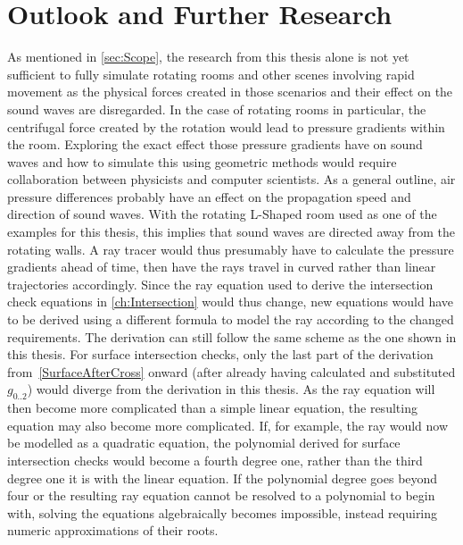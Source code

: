 \chapter{Outlook and Further Research}\label{ch:Outlook}

As mentioned in \autoref{sec:Scope},
the research from this thesis alone is not yet sufficient to fully simulate rotating rooms
and other scenes involving rapid movement
as the physical forces created in those scenarios and their effect on the sound waves are disregarded.
\newline
In the case of rotating rooms in particular,
the centrifugal force created by the rotation would lead to pressure gradients within the room.
Exploring the exact effect those pressure gradients have on sound waves
and how to simulate this using geometric methods would require collaboration between physicists and computer scientists.
\newline
As a general outline, air pressure differences probably have an effect on the propagation speed and direction of sound waves.
With the rotating L-Shaped room used as one of the examples for this thesis,
this implies that sound waves are directed away from the rotating walls.
A ray tracer would thus presumably have to calculate the pressure gradients ahead of time,
then have the rays travel in curved rather than linear trajectories accordingly.
\newline
Since the ray equation used to derive the intersection check equations in \autoref{ch:Intersection} would thus change,
new equations would have to be derived using a different formula to model the ray according to the changed requirements.
The derivation can still follow the same scheme as the one shown in this thesis.
For surface intersection checks, only the last part of the derivation from~\eqref{SurfaceAfterCross} onward
(after already having calculated and substituted \(g_{0..2}\)) would diverge from the derivation in this thesis.
\newline
As the ray equation will then become more complicated than a simple linear equation,
the resulting equation may also become more complicated.
If, for example, the ray would now be modelled as a quadratic equation,
the polynomial derived for surface intersection checks would become a fourth degree one,
rather than the third degree one it is with the linear equation.
If the polynomial degree goes beyond four
or the resulting ray equation cannot be resolved to a polynomial to begin with,
solving the equations algebraically becomes impossible,
instead requiring numeric approximations of their roots.
